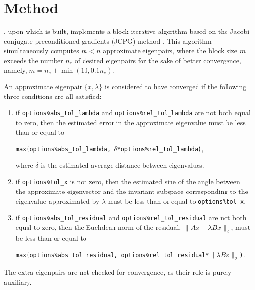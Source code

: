 \documentclass{spral}
\begin{document}
\section{Method}
\label{sec:method}

{\tt \engine}, upon which {\tt\fullpackagename} is built,
implements a block iterative algorithm
based on the Jacobi-conjugate preconditioned gradients (JCPG) method
\cite{jcpg1,jcpg2}.
This algorithm simultaneously computes $m < n$ approximate eigenpairs,
where the block size $m$ exceeds the number $n_e$ of desired eigenpairs
for the sake of better convergence, namely,
$m = n_e + \min(10, 0.1 n_e)$.

An approximate eigenpair 
$\{x,\lambda\}$ is considered to have converged
if %
the following three conditions are all satisfied:
%
\begin{enumerate}
%
\item
if {\tt options\%abs\_tol\_lambda} and 
{\tt options\%rel\_tol\_lambda}
are not both equal to zero, then
the estimated error in the approximate eigenvalue
must be less than or equal to

{\tt max(options\%abs\_tol\_lambda, 
$\delta$*options\%rel\_tol\_lambda)},

where $\delta$ is the estimated average distance
between eigenvalues.
\item
if {\tt options\%tol\_x} is not zero, then
the estimated sine of the angle between
the approximate eigenvector and the invariant subspace
corresponding to the eigenvalue 
approximated by $\lambda$
must be less than or equal to {\tt options\%tol\_x}.
%
\item
if {\tt options\%abs\_tol\_residual} and 
{\tt options\%rel\_tol\_residual}
are not both equal to zero, then
the Euclidean norm of the residual,
$\|A x - \lambda B x\|_2$,
must be less than or equal to

{\tt max(options\%abs\_tol\_residual, 
options\%rel\_tol\_residual*$\|\lambda B x\|_2$)}.
%
\end{enumerate}
%
The extra eigenpairs are not checked for convergence,
as their role is purely auxiliary.
\end{document}
